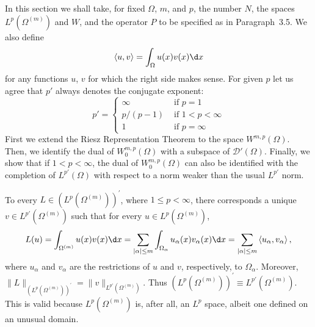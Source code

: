 \begin{para}
  In this section we shall take, for fixed $\Omega$, $m$, and $p$, the number $N$,
  the spaces $L^p(\Omega^{(m)})$ and $W$, and the operator $P$ to be specified as in 
  Paragraph~3.5. We also define
  \[
  \langle u, v\rangle = \int_{\Omega} u(x) v(x) \d x
  \]
  for any functions $u$, $v$ for which the right side makes sense.
  For given $p$ let us agree that $p'$ always denotes the conjugate exponent:
  \[
  p' = 
    \begin{cases}
      \infty & \text { if } p=1 \\
      p /(p-1) & \text { if } 1<p<\infty \\
      1 & \text { if } p=\infty
    \end{cases}
  \]
  First we extend the Riesz Representation Theorem to the space $W^{m,p}(\Omega)$.
  Then, we identify the dual of $W_0^{m, p}(\Omega)$ with a subspace of $\mathscr{D}'(\Omega)$. 
  Finally, we show that if $1<p<\infty$, the dual of $W_0^{m, p}(\Omega)$ can also be identified 
  with the completion of $L^{p'}(\Omega)$ with respect to a norm weaker than the
  usual $L^{p'}$ norm.
\end{para}


\begin{para}
  To every $L\in\left(L^p(\Omega^{(m)})\right)^{\prime}$, where $1 \leq p<\infty$, 
  there corresponds a unique $v \in L^{p'}(\Omega^{(m)})$ such that for every 
  $u \in L^p(\Omega^{(m)})$,
  \[
   L(u)=\int_{\Omega^{(m)}} u(x) v(x) \d x=\sum_{|\alpha| \leq m} \int_{\Omega_\alpha} u_\alpha(x)v_\alpha(x) \d x=\sum_{|\alpha| \leq m}\left\langle u_\alpha, v_\alpha\right\rangle,
  \]
  where $u_\alpha$ and $v_\alpha$ are the restrictions of $u$ and $v$, respectively, to $\Omega_\alpha$.
  Moreover, $\|L\|_{\left(L^p(\Omega^{(m)})\right)^{\prime}} = \|v\|_{L^{p'}(\Omega^{(m)})}$.
  Thus $\left(L^p(\Omega^{(m)})\right)^{\prime} \equiv L^{p'}(\Omega^{(m)})$.
  This is valid because $L^p(\Omega^{(m)})$ is,
  after all, an $L^p$ space, albeit one defined on an unusual domain.
\end{para}

